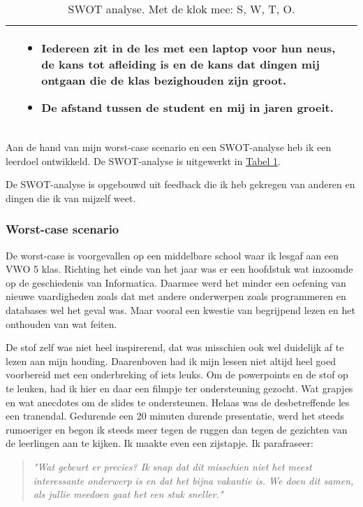 \begin{table}[h]
\begin{center}
\begin{tabular}{ l | p{6cm} | p{6cm} }
\begin{itemize}[noitemsep, leftmargin=*]
       \end{itemize}
       & 
       \begin{itemize}[noitemsep, leftmargin=*]
         \item{Iedereen zit in de les met een laptop voor hun neus, de kans tot afleiding is en de kans dat dingen mij ontgaan die de klas bezighouden zijn groot.}
         \item{De afstand tussen de student en mij in jaren groeit.}
       \end{itemize}
       \\
     \hline
   \end{tabular}
   \caption{SWOT analyse. Met de klok mee: S, W, T, O.}
   \label{tab:SWOTDidactiek}
  \end{center}
 \end{table}

Aan de hand van mijn worst-case scenario en een SWOT-analyse heb ik een leerdoel ontwikkeld. De SWOT-analyse is uitgewerkt in \hyperref[tab:SWOTDidactiek]{Tabel 1}.

De SWOT-analyse is opgebouwd uit feedback die ik heb gekregen van anderen en dingen die ik van mijzelf weet.

\subsubsection{Worst-case scenario}
De worst-case is voorgevallen op een middelbare school waar ik lesgaf aan een VWO 5 klas. Richting het einde van het jaar was er een hoofdstuk wat inzoomde op de geschiedenis van Informatica. Daarmee werd het minder een oefening van nieuwe vaardigheden zoals dat met andere onderwerpen zoals programmeren en databases wel het geval was. Maar vooral een kwestie van begrijpend lezen en het onthouden van wat feiten.

De stof zelf was niet heel inspirerend, dat was misschien ook wel duidelijk af te lezen aan mijn houding. Daarenboven had ik mijn lessen niet altijd heel goed voorbereid met een onderbreking of iets leuks. Om de powerpoints en de stof op te leuken, had ik hier en daar een filmpje ter ondersteuning gezocht. Wat grapjes en wat anecdotes om de slides te ondersteunen. Helaas was de desbetreffende les een tranendal. Gedurende een 20 minuten durende presentatie, werd het steeds rumoeriger en begon ik steeds meer tegen de ruggen dan tegen de gezichten van de leerlingen aan te kijken. Ik maakte even een zijstapje. Ik parafraseer:
\begin{quote}
  \textit{"Wat gebeurt er precies? Ik snap dat dit misschien niet het meest interessante onderwerp is en dat het bijna vakantie is. We doen dit samen, als jullie meedoen gaat het een stuk sneller."}
\end{quote}

